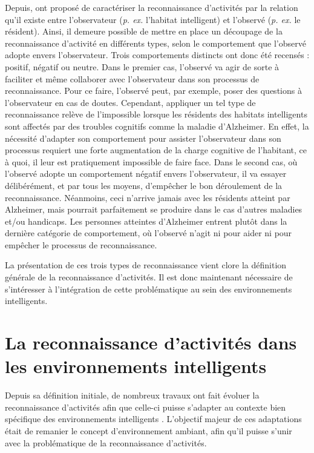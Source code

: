 {{Depuis, \cite{Roy2013} ont proposé de caractériser la reconnaissance d'activités par la relation qu'il existe entre l'observateur (\textit{p. ex.} l'habitat intelligent) et l'observé (\textit{p. ex.} le résident). Ainsi, il demeure possible de mettre en place un découpage de la reconnaissance d'activité en différents types, selon le comportement que l'observé adopte envers l'observateur. Trois comportements distincts ont donc été recensés : positif, négatif ou neutre. Dans le premier cas, l'observé va agir de sorte à faciliter et même collaborer avec l'observateur dans son processus de reconnaissance. Pour ce faire, l'observé peut, par exemple, poser des questions à l'observateur en cas de doutes. Cependant, appliquer un tel type de reconnaissance relève de l'impossible lorsque les résidents des habitats intelligents sont affectés par des troubles cognitifs comme la maladie d'Alzheimer. En effet, la nécessité d'adapter son comportement pour assister l'observateur dans son processus requiert une forte augmentation de la charge cognitive de l'habitant, ce à quoi, il leur est pratiquement impossible de faire face. Dans le second cas, où l'observé adopte un comportement négatif envers l'observateur, il va essayer délibérément, et par tous les moyens, d'empêcher le bon déroulement de la reconnaissance. Néanmoins, ceci n'arrive jamais avec les résidents atteint par Alzheimer, mais pourrait parfaitement se produire dans le cas d'autres maladies et/ou handicaps. Les personnes atteintes d'Alzheimer entrent plutôt dans la dernière catégorie de comportement, où l'observé n'agit ni pour aider ni pour empêcher le processus de reconnaissance.

La présentation de ces trois types de reconnaissance vient clore la définition générale de la reconnaissance d'activités. Il est donc maintenant nécessaire de s'intéresser à l'intégration de cette problématique au sein des environnements intelligents.

\section{La reconnaissance d'activités dans les environnements intelligents}

Depuis sa définition initiale, de nombreux travaux ont fait évoluer la reconnaissance d'activités afin que celle-ci puisse s'adapter au contexte bien spécifique des environnements intelligents \citep{Patterson2005, Boger2006, Bouchard2007, Ghayvat2018}. L'objectif majeur de ces adaptations était de remanier le concept d'environnement ambiant, afin qu'il puisse s'unir avec la problématique de la reconnaissance d'activités. 

}}
